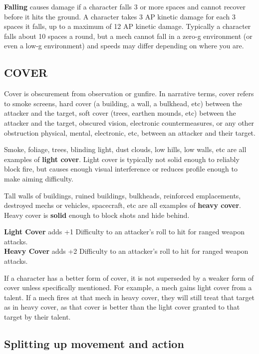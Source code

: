 \textbf{Falling} causes damage if a character falls 3 or more spaces and cannot recover before it hits the ground. A character takes 3 AP kinetic damage for each 3 spaces it falls, up to a maximum of 12 AP kinetic damage. Typically a character falls about 10 spaces a round, but a mech cannot fall in a zero-g environment (or even a low-g environment) and speeds may differ depending on where you are.

\subsection{COVER}

Cover is obscurement from observation or gunfire. In narrative terms, cover refers to smoke screens, hard cover (a building, a wall, a bulkhead, etc) between the attacker and the target, soft cover (trees, earthen mounds, etc) between the attacker and the target, obscured vision, electronic countermeasures, or any other obstruction physical, mental, electronic, etc, between an attacker and their target.

Smoke, foliage, trees, blinding light, dust clouds, low hills, low walls, etc are all examples of \textbf{light cover}. Light cover is typically not solid enough to reliably block fire, but causes enough visual interference or reduces profile enough to make aiming difficulty.

Tall walls of buildings, ruined buildings, bulkheads, reinforced emplacements, destroyed mechs or vehicles, spacecraft, etc are all examples of \textbf{heavy cover}. Heavy cover is \textbf{solid} enough to block shots and hide behind.

\textbf{Light Cover} adds +1 Difficulty to an attacker’s roll to hit for ranged weapon attacks.\\
\textbf{Heavy Cover} adds +2 Difficulty to an attacker’s roll to hit for ranged weapon attacks.

If a character has a better form of cover, it is not superseded by a weaker form of cover unless specifically mentioned. For example, a mech gains light cover from a talent. If a mech fires at that mech in heavy cover, they will still treat that target as in heavy cover, as that cover is better than the light cover granted to that target by their talent.


\subsection{Splitting up movement and action}


